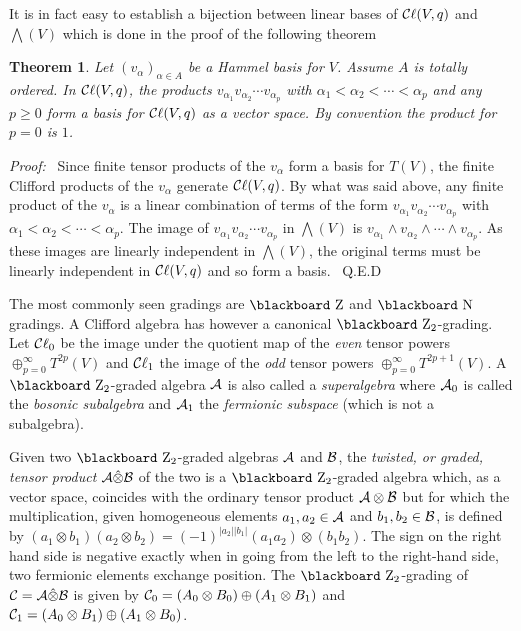 \documentclass[12pt,titlepage]{article}
\def\bbf#1{\hbox{\blackboard #1}}
\def\lN{\bbf N}
\def\lZ{\bbf Z}
\def\cA{{\cal A}}
\def\cB{{\cal B}}
\def\cC{{\cal C}}
\def\Cl{{\cC\ell}}
\newtheorem{theorem}{Theorem}
\newenvironment{proof}{{\em Proof:\/}\ }{\ Q.E.D}
\begin{document}
It is in fact easy to establish a bijection between
linear bases of \(\Cl(V,q)\) and \(\bigwedge(V)\) which is done in the
proof of the following theorem
\begin{theorem}\label{th:cliffbasis}
Let \((v_\alpha)_{\alpha\in A}\) be a Hammel basis for \(V\). Assume
\(A\) is totally ordered. In \(\Cl(V,q)\), the products 
\(v_{\alpha_1}v_{\alpha_2}\cdots v_{\alpha_p}\)  with
\(\alpha_1<\alpha_2<\cdots<\alpha_p\) and any \(p\ge 0\)
 form a basis for \(\Cl(V,q)\) as a
vector space. By convention the product for \(p=0\) is \(1\).
\end{theorem}
\begin{proof}
Since 
finite tensor products of the \(v_\alpha\) form a basis for \(T(V)\), the 
finite Clifford products of the \(v_\alpha\) generate  \(\Cl(V,q)\). 
By what was said above, 
any finite 
product of the \(v_\alpha\) is a linear combination of terms of the form  
\(v_{\alpha_1}v_{\alpha_2}\cdots v_{\alpha_p}\) with 
\(\alpha_1<\alpha_2<\cdots<\alpha_p\).   The image of 
\(v_{\alpha_1}v_{\alpha_2}\cdots v_{\alpha_p}\) in 
\(\bigwedge(V)\) is \(v_{\alpha_1}\wedge 
v_{\alpha_2}\wedge\cdots\wedge v_{\alpha_p}\). As these images are linearly 
independent in \(\bigwedge(V)\),  the original terms must be linearly 
independent in \(\Cl(V,q)\) and so form a basis.
\end{proof}



The most commonly seen gradings are \(\lZ\) and \(\lN\) gradings.
A Clifford algebra has however a canonical \(\lZ_2\)-grading.
Let \(\Cl_0\) be the image under the quotient map
of the {\em even\/} tensor powers \(\oplus_{p=0}^\infty T^{2p}(V)\)
and \(\Cl_1\) the image
of the {\em odd\/} tensor powers \(\oplus_{p=0}^\infty T^{2p+1}(V)\).
 A
\(\lZ_2\)-graded algebra \(\cA\) is also called a {\em superalgebra\/}
%
where \(\cA_0\) is called the {\em bosonic subalgebra\/}
%
 and \(\cA_1\) the {\em
fermionic subspace\/}
%
 (which is not a subalgebra).

Given two \(\lZ_2\)-graded algebras \(\cA\) and \(\cB\), the {\em
twisted, or graded, tensor product\/} 
%
%
\(\cA\hat\otimes\cB\) of the two is a
\(\lZ_2\)-graded algebra which, as a vector space, coincides with the
ordinary tensor product \(\cA\otimes\cB\) but for which the multiplication,
given homogeneous
elements \(a_1,a_2\in \cA\) and \(b_1,b_2\in\cB\),
 is defined by
\((a_1\otimes b_1)(a_2\otimes b_2)=
(-1)^{|a_2||b_1|}(a_1a_2)\otimes (b_1b_2)\). The sign on the right hand
side
is negative exactly when in going from the left to the right-hand side,
two fermionic elements exchange position. The \(\lZ_2\)-grading of
\(\cC=\cA\hat\otimes\cB\) is given by
\(\cC_0=(A_0\otimes B_0)\oplus(A_1\otimes B_1)\) and
\(\cC_1=(A_0\otimes B_1)\oplus(A_1\otimes B_0)\).
\end{document}
